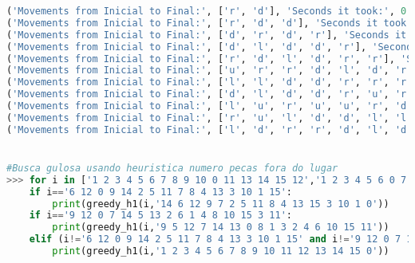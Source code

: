 \documentclass{article}
\begin{document}
\begin{lstlisting}[language = Python]
('Movements from Inicial to Final:', ['r', 'd'], 'Seconds it took:', 0.0010001659393310547, 'Maximum space used:', 3)
('Movements from Inicial to Final:', ['r', 'd', 'd'], 'Seconds it took:', 0.0019986629486083984, 'Maximum space used:', 4)
('Movements from Inicial to Final:', ['d', 'r', 'd', 'r'], 'Seconds it took:', 0.007996320724487305, 'Maximum space used:', 5)
('Movements from Inicial to Final:', ['d', 'l', 'd', 'd', 'r'], 'Seconds it took:', 0.0179898738861084, 'Maximum space used:', 6)
('Movements from Inicial to Final:', ['r', 'd', 'l', 'd', 'r', 'r'], 'Seconds it took:', 0.027985095977783203, 'Maximum space used:', 7)
('Movements from Inicial to Final:', ['u', 'r', 'r', 'd', 'l', 'd', 'r'], 'Seconds it took:', 0.08896303176879883, 'Maximum space used:', 8)
('Movements from Inicial to Final:', ['l', 'l', 'd', 'd', 'r', 'r', 'r', 'd'], 'Seconds it took:', 0.12092328071594238, 'Maximum space used:', 9)
('Movements from Inicial to Final:', ['d', 'l', 'd', 'd', 'r', 'u', 'r', 'd', 'r'], 'Seconds it took:', 0.3687739372253418, 'Maximum space used:', 10)
('Movements from Inicial to Final:', ['l', 'u', 'r', 'u', 'u', 'r', 'd', 'd', 'r', 'd'], 'Seconds it took:', 0.6276133060455322, 'Maximum space used:', 11)
('Movements from Inicial to Final:', ['r', 'u', 'l', 'd', 'd', 'l', 'l', 'u', 'r', 'r', 'd', 'r'], 'Seconds it took:', 3.587789297103882, 'Maximum space used:', 13)
('Movements from Inicial to Final:', ['l', 'd', 'r', 'r', 'd', 'l', 'd', 'l', 'l', 'u', 'r', 'r', 'u'], 'Seconds it took:', 6.748943328857422, 'Maximum space used:', 14)


#Busca gulosa usando heuristica numero pecas fora do lugar
>>> for i in ['1 2 3 4 5 6 7 8 9 10 0 11 13 14 15 12','1 2 3 4 5 6 0 7 9 10 11 8 13 14 15 12','1 2 3 4 5 0 7 8 9 6 10 12 13 14 11 15','1 2 3 0 5 6 8 4 9 10 7 12 13 14 11 15','1 2 3 4 5 0 6 8 9 11 7 12 13 10 14 15','1 2 3 4 5 10 6 7 9 0 12 8 13 14 11 15','6 12 0 9 14 2 5 11 7 8 4 13 3 10 1 15','1 0 3 4 6 2 7 8 5 14 10 12 9 13 11 15','1 6 2 4 5 10 3 8 13 9 7 11 14 0 15 12','1 2 3 4 5 6 8 12 13 9 0 7 14 11 10 15','9 12 0 7 14 5 13 2 6 1 4 8 10 15 3 11']:
	if i=='6 12 0 9 14 2 5 11 7 8 4 13 3 10 1 15':
		print(greedy_h1(i,'14 6 12 9 7 2 5 11 8 4 13 15 3 10 1 0'))
	if i=='9 12 0 7 14 5 13 2 6 1 4 8 10 15 3 11':
		print(greedy_h1(i,'9 5 12 7 14 13 0 8 1 3 2 4 6 10 15 11'))
	elif (i!='6 12 0 9 14 2 5 11 7 8 4 13 3 10 1 15' and i!='9 12 0 7 14 5 13 2 6 1 4 8 10 15 3 11'):
		print(greedy_h1(i,'1 2 3 4 5 6 7 8 9 10 11 12 13 14 15 0'))


\end{lstlisting}
\end{document}
